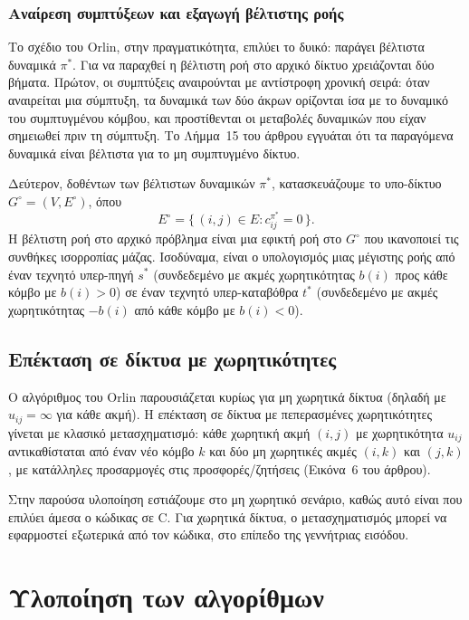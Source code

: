 \documentclass[11pt,a4paper,oneside]{report}
\let\oldsubsection\subsection
\renewcommand{\subsection}{\FloatBarrier\oldsubsection}
\begin{document}
\subsection{Αναίρεση συμπτύξεων και εξαγωγή βέλτιστης ροής}

Το σχέδιο του \textenglish{Orlin}, στην πραγματικότητα, επιλύει το δυικό: παράγει βέλτιστα δυναμικά $\pi^{*}$. Για να παραχθεί η βέλτιστη ροή στο αρχικό δίκτυο χρειάζονται δύο βήματα. Πρώτον, οι συμπτύξεις αναιρούνται με αντίστροφη χρονική σειρά: όταν αναιρείται μια σύμπτυξη, τα δυναμικά των δύο άκρων ορίζονται ίσα με το δυναμικό του συμπτυγμένου κόμβου, και προστίθενται οι μεταβολές δυναμικών που είχαν σημειωθεί πριν τη σύμπτυξη. Το Λήμμα~15 του άρθρου εγγυάται ότι τα παραγόμενα δυναμικά είναι βέλτιστα για το μη συμπτυγμένο δίκτυο.

Δεύτερον, δοθέντων των βέλτιστων δυναμικών $\pi^{*}$, κατασκευάζουμε το υπο-δίκτυο $G^{\circ} = (V, E^{\circ})$, όπου
\[
E^{\circ} = \{\, (i,j) \in E : c^{\pi^{*}}_{ij} = 0 \,\}.
\]
Η βέλτιστη ροή στο αρχικό πρόβλημα είναι μια εφικτή ροή στο $G^{\circ}$ που ικανοποιεί τις συνθήκες ισορροπίας μάζας. Ισοδύναμα, είναι ο υπολογισμός μιας μέγιστης ροής από έναν τεχνητό υπερ-πηγή $s^{*}$ (συνδεδεμένο με ακμές χωρητικότητας $b(i)$ προς κάθε κόμβο με $b(i) > 0$) σε έναν τεχνητό υπερ-καταβόθρα $t^{*}$ (συνδεδεμένο με ακμές χωρητικότητας $-b(i)$ από κάθε κόμβο με $b(i) < 0$).

\section{Επέκταση σε δίκτυα με χωρητικότητες}

Ο αλγόριθμος του \textenglish{Orlin} παρουσιάζεται κυρίως για μη χωρητικά δίκτυα (δηλαδή με $u_{ij} = \infty$ για κάθε ακμή). Η επέκταση σε δίκτυα με πεπερασμένες χωρητικότητες γίνεται με κλασικό μετασχηματισμό: κάθε χωρητική ακμή $(i,j)$ με χωρητικότητα $u_{ij}$ αντικαθίσταται από έναν νέο κόμβο $k$ και δύο μη χωρητικές ακμές $(i,k)$ και $(j,k)$, με κατάλληλες προσαρμογές στις προσφορές/ζητήσεις (Εικόνα~6 του άρθρου).

Στην παρούσα υλοποίηση εστιάζουμε στο μη χωρητικό σενάριο, καθώς αυτό είναι που επιλύει άμεσα ο κώδικας σε \textenglish{C}. Για χωρητικά δίκτυα, ο μετασχηματισμός μπορεί να εφαρμοστεί εξωτερικά από τον κώδικα, στο επίπεδο της γεννήτριας εισόδου.

\chapter{Υλοποίηση των αλγορίθμων}
\end{document}
